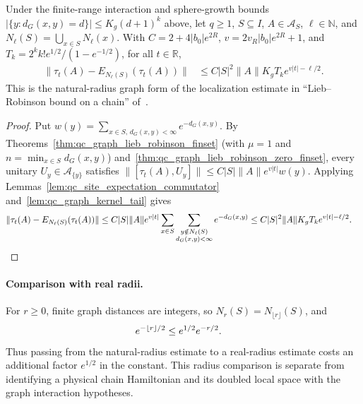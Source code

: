 \begin{lemma}
    \label{thm:qc_graph_neighborhood_localization}
    \leanok
    Under the finite-range interaction and sphere-growth bounds $|\{y:d_G(x,y)=d\}|\le K_g(d+1)^k$ above, let $q\geq1$, $S\subseteq I$, $A\in\mathcal A_S$, $\ell\in\mathbb N$, and $N_\ell(S)=\bigcup_{x\in S}N_\ell(x)$. With $C=2+4|b_0|e^{2R}$, $v=2v_R|b_0|e^{2R}+1$, and $T_k=2^kk!e^{1/2}/(1-e^{-1/2})$, for all $t\in\mathbb R$,
    \begin{align}
        \|\tau_t(A)-E_{N_\ell(S)}(\tau_t(A))\|
         & \leq C|S|^2\|A\|K_gT_k e^{v|t|-\ell/2}.
        \label{eq:qc_neighborhood_localization}
    \end{align}
    This is the natural-radius graph form of the localization estimate in ``Lieb--Robinson bound on a chain'' of~\cite{TNLean2026OneDimensional}.
\end{lemma}
\begin{proof}
    \leanok
    Put $w(y)=\sum_{x\in S,\,d_G(x,y)<\infty}e^{-d_G(x,y)}$. By Theorems~\ref{thm:qc_graph_lieb_robinson_finset} (with $\mu=1$ and $n=\min_{x\in S}d_G(x,y)$) and~\ref{thm:qc_graph_lieb_robinson_zero_finset}, every unitary $U_y\in\mathcal A_{\{y\}}$ satisfies $\|[\tau_t(A),U_y]\|\le C|S|\|A\|e^{v|t|}w(y)$. Applying Lemmas~\ref{lem:qc_site_expectation_commutator} and~\ref{lem:qc_graph_kernel_tail} gives
    \begin{align}
        \|\tau_t(A)-E_{N_\ell(S)}(\tau_t(A))\|
         & \leq C|S|\|A\|e^{v|t|}\sum_{x\in S}\sum_{\substack{y\notin N_\ell(S) \\d_G(x,y)<\infty}}e^{-d_G(x,y)}
        \leq C|S|^2\|A\|K_gT_ke^{v|t|-\ell/2}.\notag
    \end{align}
\end{proof}

\paragraph{Comparison with real radii.}
For $r\geq0$, finite graph distances are integers, so
$N_r(S)=N_{\lfloor r\rfloor}(S)$, and
\begin{align}
    e^{-\lfloor r\rfloor/2} & \leq e^{1/2}e^{-r/2}.\notag
\end{align}
Thus passing from the natural-radius estimate to a real-radius estimate costs
an additional factor $e^{1/2}$ in the constant. This radius comparison is
separate from identifying a physical chain Hamiltonian and its doubled local
space with the graph interaction hypotheses.

